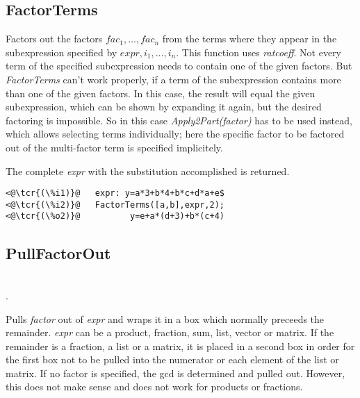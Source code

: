 \documentclass[../Maxima_Workbook.tex]{subfiles}
\begin{document}
\subsection{FactorTerms}

\lz {} \hfill {}

\lz Factors out the factors $ fac_1,\dots,fac_n $ from the terms where they appear in the subexpression specified by $ expr, i_1,\dots,i_n $. This function uses \emph{ratcoeff}. Not every term of the specified subexpression needs to contain one of the given factors. But \emph{FactorTerms} can't work properly, if a term of the subexpression contains more than one of the given factors. In this case, the result will equal the given subexpression, which can be shown by expanding it again, but the desired factoring is impossible. So in this case \emph{Apply2Part(factor)} has to be used instead, which allows selecting terms individually; here the specific factor to be factored out of the multi-factor term is specified implicitely.

\lz The complete \emph{expr} with the substitution accomplished is returned.

\lz \begin{small}
\color{blue}
\begin{lstlisting}
<@\tcr{(\%i1)}@   expr: y=a*3+b*4+b*c+d*a+e$
<@\tcr{(\%i2)}@   FactorTerms([a,b],expr,2);
<@\tcr{(\%o2)}@			 y=e+a*(d+3)+b*(c+4)
\end{lstlisting}
\color{black}
\end{small}

\subsection{PullFactorOut}

\lz {} \\ . \hfill {} \\
 \hfill {}

\lz Pulls \emph{factor} out of \emph{expr} and wraps it in a box which normally preceeds the remainder. \emph{expr} can be a product, fraction, sum, list, vector or matrix. If the remainder is a fraction, a list or a matrix, it is placed in a second box in order for the first box not to be pulled into the numerator or each element of the list or matrix. If no factor is specified, the gcd is determined and pulled out. However, this does not make sense and does not work for products or fractions.
\end{document}

